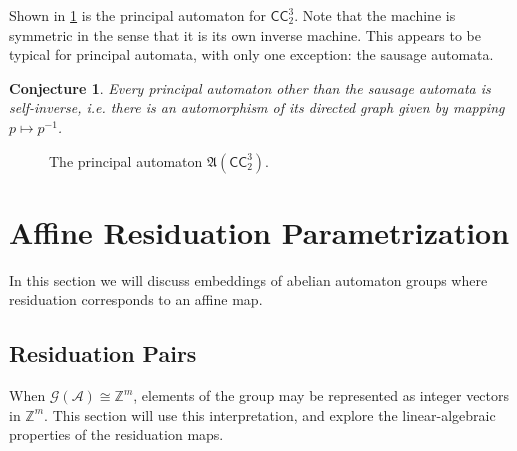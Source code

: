 \documentclass[12pt, letterpaper]{article}
\newcommand{\Z}{\mathbb Z}
\newcommand{\A}{\mathcal A}
\newcommand{\CC}{\mathsf{CC}}
\newcommand{\princ}{\mathfrak A}
\newcommand{\gp}{\mathcal G}
\newtheorem{conj}[thm]{Conjecture}
\begin{document}
Shown in \cref{fig:princ-ccc-3-2} is the principal automaton for $\CC^3_2$.
Note that the machine is symmetric in the sense that it is its own inverse
machine. This appears to be typical for principal automata, with only one
exception: the sausage automata.
\begin{conj}\label{conj:skew-symmetry}
    Every principal automaton other than the sausage automata is self-inverse,
    i.e. there is an automorphism of its directed graph given by mapping
    $p \mapsto p^{-1}$.
\end{conj}

\begin{figure}[h]
    \centering
    \caption{The principal automaton $\princ(\CC^3_2)$.}
    \label{fig:princ-ccc-3-2}
\end{figure}


\pagebreak
\section{Affine Residuation Parametrization}\label{sec:alg-num-theory}
In this section we will discuss embeddings of abelian automaton groups where
residuation corresponds to an affine map.

\subsection{Residuation Pairs}\label{sec:matrix_rep}
When $\gp(\A) \cong \Z^m$, elements of the group may be represented as integer
vectors in $\Z^m$. This section will use this interpretation, and explore the
linear-algebraic properties of the residuation maps.
\end{document}
